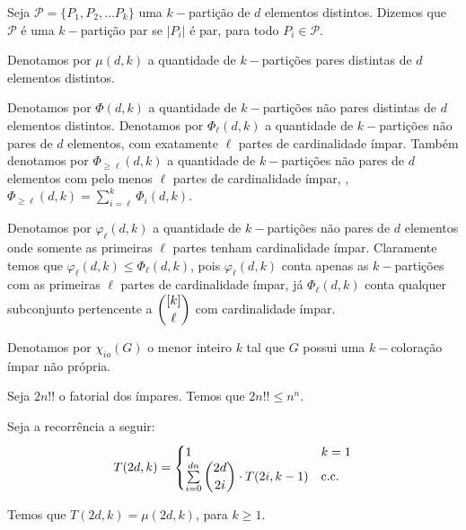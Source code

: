 \documentclass[12pt]{article}
\begin{document}
 \begin{defi}
 	\label{defi1}
 	Seja $\mathcal{P} = \{P_1, P_2, \ldots P_k \}$ uma $k-$partição de $d$ elementos distintos. Dizemos que $\mathcal{P}$ é uma $k-$partição par se $|P_i|$ é par, para todo $P_i \in \mathcal{P}$.
 \end{defi} \newbegin
  
 
 \begin{defi}
 	\label{defi2}
 	Denotamos por $\mu(d, k)$ a quantidade de $k-$partições pares distintas de $d$ elementos distintos.
 \end{defi} \newbegin
 
  \begin{defi}
 	\label{defi3}
 	Denotamos por $\Phi(d, k)$ a quantidade de $k-$partições não pares distintas de $d$ elementos distintos. Denotamos por $\Phi_\ell(d, k)$ a quantidade de $k-$partições não pares de $d$ elementos, com exatamente $\ell$
 	partes de cardinalidade ímpar. Também denotamos por $\Phi_{\geq \ell}(d, k)$ a quantidade de $k-$partições não pares de $d$ elementos com pelo menos $\ell$ partes de cardinalidade ímpar, \ie, $\Phi_{\geq \ell}(d, k) = \sum\limits_{i = \ell}^{k} \Phi_{i}(d, k)$. 
 \end{defi} \newbegin
  
   \begin{defi}
 	\label{def4}
   Denotamos por $\varphi_\ell(d, k)$ a quantidade de $k-$partições não pares de $d$ elementos onde somente as primeiras $\ell$ partes tenham cardinalidade ímpar. Claramente temos que $\varphi_\ell(d, k) \leq \Phi_\ell(d, k)$, pois $\varphi_\ell(d, k)$ conta apenas as $k-$partições com as primeiras $\ell$ partes de cardinalidade ímpar, já $\Phi_\ell(d, k)$ conta qualquer subconjunto pertencente a $\escolhe{[k]}{\ell}$ com cardinalidade ímpar.
 \end{defi} \newbegin
 
  \begin{defi}
 	\label{def5}
 	Denotamos por $\chi_{io}(G)$ o menor inteiro $k$ tal que  $G$ possui uma $k-$coloração ímpar não própria. 
 \end{defi} \newbegin
 
 \begin{prop}
 	\label{prop3}
 	Seja $2n!!$ o fatorial dos ímpares. Temos que $2n!! \leq n^n$.
 \end{prop} \newbegin
 
 
 \begin{lema}  
 	\label{lema2}
 	Seja a recorrência a seguir: \\
 	
 		\begin{equation}
 		T(2d, k) =
 		\begin{cases}
 			1 & \text{$k = 1$} \\
 			\sum\limits_{i = 0}^{dn} \escolhe{2d}{2i} \cdot T(2i, k-1) & \text{c.c.} \\ 
 		\end{cases}
 	\end{equation}
 	
 	Temos que $T(2d, k) = \mu(2d, k)$, para $k \geq 1$.
 \end{lema}
 
\end{document}
